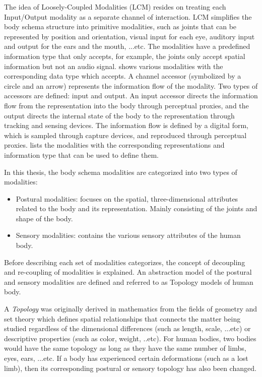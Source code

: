 The idea of Loosely-Coupled Modalities (LCM) resides on treating each Input/Output modality as a separate channel of interaction. LCM simplifies the body schema structure into primitive modalities, such as joints that can be represented by position and orientation, visual input for each eye, auditory input and output for the ears and the mouth, ...etc. The modalities have a predefined information type that only accepts, for example, the joints only accept spatial information but not an audio signal.  shows various modalities with the corresponding data type which accepts. A channel accessor (symbolized by a circle and an arrow) represents the information flow of the modality. Two types of accessors are defined: input and output. An input accessor directs the information flow from the representation into the body through perceptual proxies, and the output directs the internal state of the body to the representation through tracking and sensing devices. The information flow is defined by a digital form, which is sampled through capture devices, and reproduced through perceptual proxies.  lists the modalities with the corresponding representations and information type that can be used to define them.

In this thesis, the body schema modalities are categorized into two types of modalities: 
\begin{itemize}
\item Postural modalities: focuses on the spatial, three-dimensional attributes related to the body and its representation. Mainly consisting of the joints and shape of the body. 
\item Sensory modalities: contains the various sensory attributes of the human body. 
\end{itemize}

Before describing each set of modalities categorizes, the concept of decoupling and re-coupling of modalities is explained. An abstraction model of the postural and sensory modalities are defined and referred to as Topology models of human body. 

A \textit{Topology} was originally derived in mathematics from the fields of geometry and set theory which defines spatial relationships that connects the matter being studied regardless of the dimensional differences (such as length, scale, ...etc) or descriptive properties (such as color, weight, ..etc). For human bodies, two bodies would have the same topology as long as they have the same number of limbs, eyes, ears, ...etc. If a body has experienced certain deformations (such as a lost limb), then its corresponding postural or sensory topology has also been changed.

